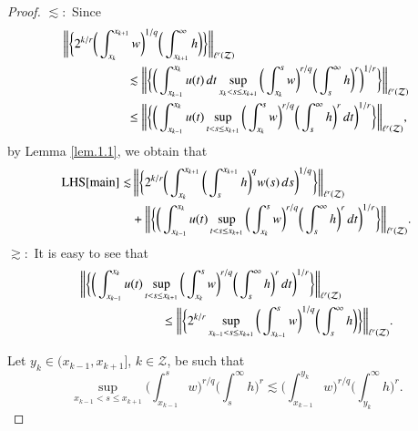 \documentclass[12pt]{amsart}
\theoremstyle{plain}
\theoremstyle{definition}
\numberwithin{thm}{section}
\numberwithin{equation}{section}
\begin{document}
\begin{proof}
{\bf $\lesssim:$} Since
	\begin{align*}
	\bigg\| \bigg\{ 2^{k / r} \bigg( \int_{x_k}^{x_{k+1}} w \bigg)^{1 / q} \bigg( \int_{x_{k+1}}^{\infty} h \bigg) \bigg\} \bigg\|_{\ell^r({\mathcal Z})} & \\
	& \hspace{-3cm} \lesssim \bigg\| \bigg\{\bigg( \int_{x_{k-1}}^{x_k} u(t)\,dt \sup_{x_k < s  \le x_{k+1}} \bigg( \int_{x_k}^s w \bigg)^{r / q} \bigg( \int_s^{\infty} h \bigg)^r \bigg)^{1/r} \bigg\} \bigg\|_{\ell^r({\mathcal Z})} \\
	& \hspace{-3cm} \le \bigg\| \bigg\{ \bigg( \int_{x_{k-1}}^{x_k} u(t) \sup_{t < s \le x_{k+1}} \bigg(
	\int_{x_k}^s w \bigg)^{r / q} \bigg( \int_s^{\infty} h	\bigg)^r \,dt\bigg)^{1/r} \bigg\} \bigg\|_{\ell^r({\mathcal Z})},
	\end{align*}
	by Lemma \ref{lem.1.1}, we obtain that
	\begin{align*}
	{\operatorname{LHS}}{\eqref{main}} \lesssim & \, \bigg\| \bigg\{ 2^{k / r} \bigg(
	\int_{x_k}^{x_{k+1}} \bigg( \int_s^{x_{k+1}} h \bigg)^q
	w(s)\,ds\bigg)^{ 1 / q} \bigg\} \bigg\|_{\ell^r({\mathcal Z})} \notag \\
	&  +  \bigg\| \bigg\{ \bigg( \int_{x_{k-1}}^{x_k} u(t) \sup_{t < s \le x_{k+1}} \bigg(
	\int_{x_k}^s w \bigg)^{r / q} \bigg( \int_s^{\infty} h
	\bigg)^r \,dt\bigg)^{1/r} \bigg\} \bigg\|_{\ell^r({\mathcal Z})}. 
	\end{align*}
	{\bf $\gtrsim:$} It is easy to see that
	\begin{align*}
	\bigg\| \bigg\{ \bigg( \int_{x_{k-1}}^{x_k} u(t) \sup_{t < s \le x_{k+1}} \bigg(
	\int_{x_k}^s w \bigg)^{r / q} \bigg( \int_s^{\infty} h
	\bigg)^r \,dt\bigg)^{1/r} \bigg\} \bigg\|_{\ell^r({\mathcal Z})} & \\
    & \hspace{-5cm}\le  \bigg\| \bigg\{ 2^{k / r} \sup_{x_{k-1} < s \le x_{k+1}} \bigg(
	\int_{x_{k-1}}^s w \bigg)^{1 / q} \bigg( \int_s^{\infty} h
	\bigg) \bigg\} \bigg\|_{\ell^r({\mathcal Z})}.
	\end{align*}

	Let $y_k \in (x_{k-1},x_{k+1}]$, $k \in {\mathcal Z}$, be such that
	$$
	\sup_{x_{k-1} < s \le x_{k+1}} \bigg( \int_{x_{k-1}}^s w \bigg)^{r / q} \bigg( \int_s^{\infty} h
	\bigg)^r \lesssim \bigg( \int_{x_{k-1}}^{y_k} w \bigg)^{r / q} \bigg( \int_{y_k}^{\infty} h	\bigg)^r.
	$$


\end{proof}
\end{document}
